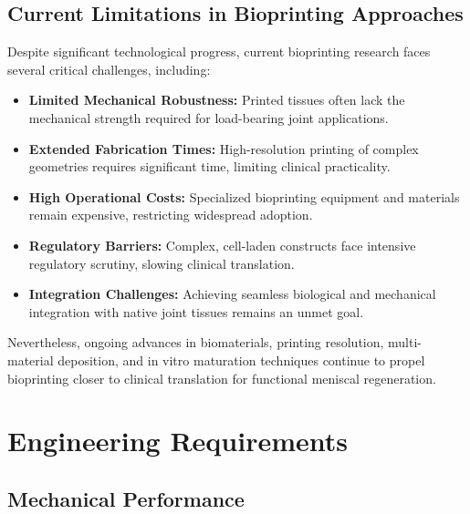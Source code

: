 \subsection{Current Limitations in Bioprinting Approaches}

Despite significant technological progress, current bioprinting research faces several critical challenges, including:

\begin{itemize}
    \item \textbf{Limited Mechanical Robustness:} Printed tissues often lack the mechanical strength required for load-bearing joint applications.
    
    \item \textbf{Extended Fabrication Times:} High-resolution printing of complex geometries requires significant time, limiting clinical practicality.
    
    \item \textbf{High Operational Costs:} Specialized bioprinting equipment and materials remain expensive, restricting widespread adoption.
    
    \item \textbf{Regulatory Barriers:} Complex, cell-laden constructs face intensive regulatory scrutiny, slowing clinical translation.
    
    \item \textbf{Integration Challenges:} Achieving seamless biological and mechanical integration with native joint tissues remains an unmet goal.
\end{itemize}

Nevertheless, ongoing advances in biomaterials, printing resolution, multi-material deposition, and in vitro maturation techniques continue to propel bioprinting closer to clinical translation for functional meniscal regeneration.

\section{Engineering Requirements}

\subsection{Mechanical Performance}

